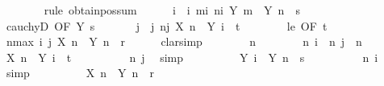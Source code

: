 \begin{isabellebody}
\ \ \ \ \ \ \isamarkupfalse%
\ {\isacharparenleft}{\kern0pt}rule\ obtain{\isacharunderscore}{\kern0pt}pos{\isacharunderscore}{\kern0pt}sum{\isacharparenright}{\kern0pt}\isanewline
\ \ \ \ \isamarkupfalse%
\ i\ \ i{\isacharcolon}{\kern0pt}\ {\isachardoublequoteopen}{\isasymforall}m{\isasymge}i{\isachardot}{\kern0pt}\ {\isasymforall}n{\isasymge}i{\isachardot}{\kern0pt}\ {\isasymbar}Y\ m\ {\isacharminus}{\kern0pt}\ Y\ n{\isasymbar}\ {\isacharless}{\kern0pt}\ s{\isachardoublequoteclose}\isanewline
\ \ \ \ \ \ \isamarkupfalse%
\ cauchyD\ {\isacharbrackleft}{\kern0pt}OF\ Y\ s{\isacharbrackright}{\kern0pt}\ \isacommand{{\isachardot}{\kern0pt}{\isachardot}{\kern0pt}}\isamarkupfalse%
\isanewline
\ \ \ \ \isamarkupfalse%
\ j\ \ j{\isacharcolon}{\kern0pt}\ {\isachardoublequoteopen}{\isasymforall}n{\isasymge}j{\isachardot}{\kern0pt}\ X\ n\ {\isasymle}\ Y\ i\ {\isacharplus}{\kern0pt}\ t{\isachardoublequoteclose}\isanewline
\ \ \ \ \ \ \isamarkupfalse%
\ le\ {\isacharbrackleft}{\kern0pt}OF\ t{\isacharbrackright}{\kern0pt}\ \isacommand{{\isachardot}{\kern0pt}{\isachardot}{\kern0pt}}\isamarkupfalse%
\isanewline
\ \ \ \ \isamarkupfalse%
\ {\isachardoublequoteopen}{\isasymforall}n{\isasymge}max\ i\ j{\isachardot}{\kern0pt}\ X\ n\ {\isasymle}\ Y\ n\ {\isacharplus}{\kern0pt}\ r{\isachardoublequoteclose}\isanewline
\ \ \ \ \isamarkupfalse%
\ clarsimp\isanewline
\ \ \ \ \ \ \isamarkupfalse%
\ n\isanewline
\ \ \ \ \ \ \isamarkupfalse%
\ n{\isacharcolon}{\kern0pt}\ {\isachardoublequoteopen}i\ {\isasymle}\ n{\isachardoublequoteclose}\ {\isachardoublequoteopen}j\ {\isasymle}\ n{\isachardoublequoteclose}\isanewline
\ \ \ \ \ \ \isamarkupfalse%
\ {\isachardoublequoteopen}X\ n\ {\isasymle}\ Y\ i\ {\isacharplus}{\kern0pt}\ t{\isachardoublequoteclose}\isanewline
\ \ \ \ \ \ \ \ \isamarkupfalse%
\ n\ j\ \isamarkupfalse%
\ simp\isanewline
\ \ \ \ \ \ \isamarkupfalse%
\ \isamarkupfalse%
\ {\isachardoublequoteopen}{\isasymbar}Y\ i\ {\isacharminus}{\kern0pt}\ Y\ n{\isasymbar}\ {\isacharless}{\kern0pt}\ s{\isachardoublequoteclose}\isanewline
\ \ \ \ \ \ \ \ \isamarkupfalse%
\ n\ i\ \isamarkupfalse%
\ simp\isanewline
\ \ \ \ \ \ \isamarkupfalse%
\ \isamarkupfalse%
\ {\isachardoublequoteopen}X\ n\ {\isasymle}\ Y\ n\ {\isacharplus}{\kern0pt}\ r{\isachardoublequoteclose}\isanewline

\end{isabellebody}
